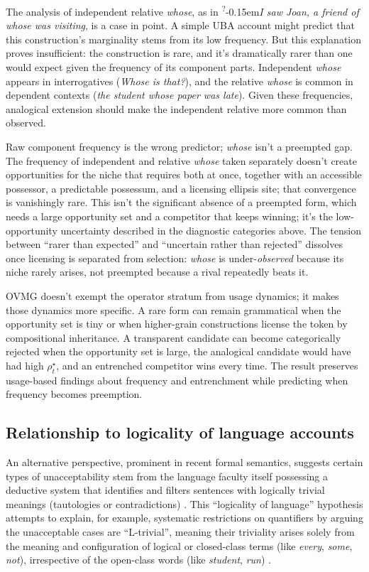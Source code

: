 \documentclass[12pt,letterpaper]{article}
\newcommand{\mention}[1]{\textit{#1}}
\newcommand{\judgesep}{\kern-0.15em}
\newcommand{\marg}[1]{\textsuperscript{?}\judgesep#1}
\begin{document}
The analysis of independent relative \mention{whose}, as in \marg{\mention{I saw Joan, a friend of whose was visiting}}, is a case in point. A simple UBA account might predict that this construction's marginality stems from its low frequency. But this explanation proves insufficient: the construction is rare, and it's dramatically rarer than one would expect given the frequency of its component parts. Independent \mention{whose} appears in interrogatives (\mention{Whose is that?}), and the relative \mention{whose} is common in dependent contexts (\mention{the student whose paper was late}). Given these frequencies, analogical extension should make the independent relative more common than observed.

Raw component frequency is the wrong predictor; \mention{whose} isn't a
preempted gap. The frequency of independent and relative \mention{whose} taken
separately doesn't create opportunities for the niche that requires both at
once, together with an accessible possessor, a predictable possessum, and a
licensing ellipsis site; that convergence is vanishingly rare. This isn't the
significant absence of a preempted form, which needs a large opportunity set and
a competitor that keeps winning; it's the low-opportunity uncertainty described
in the diagnostic categories above. The tension between \enquote{rarer than
expected} and \enquote{uncertain rather than rejected} dissolves once licensing
is separated from selection: \mention{whose} is under-\emph{observed} because
its niche rarely arises, not preempted because a rival repeatedly beats it.

OVMG doesn't exempt the operator stratum from usage dynamics; it makes those dynamics more specific. A rare form can remain grammatical when the opportunity set is tiny or when higher-grain constructions license the token by compositional inheritance. A transparent candidate can become categorically rejected when the opportunity set is large, the analogical candidate would have had high $\rho_t^\star$, and an entrenched competitor wins every time. The result preserves usage-based findings about frequency and entrenchment while predicting when frequency becomes preemption.

\subsection{Relationship to logicality of language accounts}

An alternative perspective, prominent in recent formal semantics, suggests certain types of unacceptability stem from the language faculty itself possessing a deductive system that identifies and filters sentences with logically trivial meanings (tautologies or contradictions) \autocite[cf.][]{del_pinal_logicality_2019, chierchia_logic_2013, fox_economy_2000}. This \enquote{logicality of language} hypothesis attempts to explain, for example, systematic restrictions on quantifiers by arguing the unacceptable cases are \enquote{L-trivial}, meaning their triviality arises solely from the meaning and configuration of logical or closed-class terms (like \mention{every}, \mention{some}, \mention{not}), irrespective of the open-class words (like \mention{student}, \mention{run}) \autocite{gajewski_l-triviality_2009}.
\end{document}
